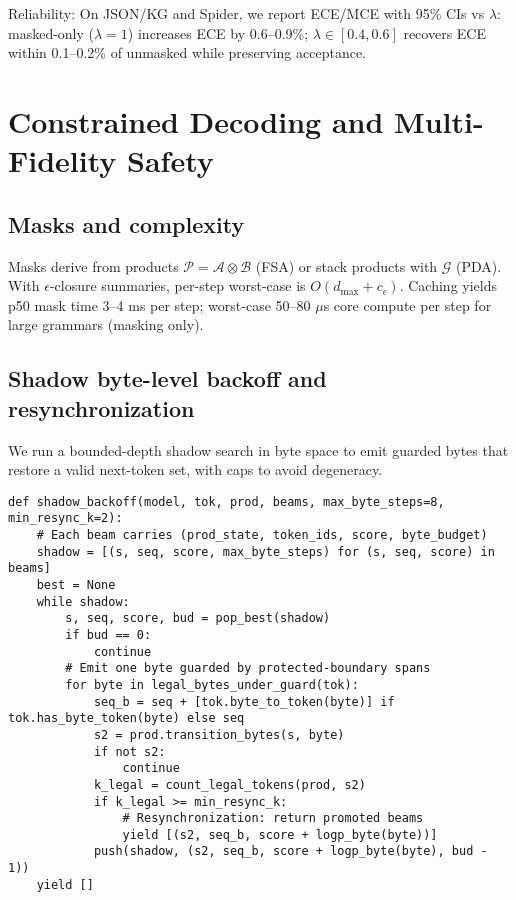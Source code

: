 \documentclass{article}
\begin{document}
Reliability: On JSON/KG and Spider, we report ECE/MCE with 95\% CIs vs $\lambda$: masked-only ($\lambda=1$) increases ECE by 0.6–0.9\%; $\lambda\in[0.4,0.6]$ recovers ECE within 0.1–0.2\% of unmasked while preserving acceptance.

\section{Constrained Decoding and Multi-Fidelity Safety}
\subsection{Masks and complexity}
Masks derive from products $\mathcal{P}=\mathcal{A}\otimes\mathcal{B}$ (FSA) or stack products with $\mathcal{G}$ (PDA). With $\epsilon$-closure summaries, per-step worst-case is $O(d_{\max}+c_\epsilon)$. Caching yields p50 mask time 3–4 ms per step; worst-case 50–80 $\mu$s core compute per step for large grammars (masking only).

\subsection{Shadow byte-level backoff and resynchronization}
We run a bounded-depth shadow search in byte space to emit guarded bytes that restore a valid next-token set, with caps to avoid degeneracy.

\begin{lstlisting}[style=py, caption={Shadow byte-level backoff with resynchronization and caps.}]
def shadow_backoff(model, tok, prod, beams, max_byte_steps=8, min_resync_k=2):
    # Each beam carries (prod_state, token_ids, score, byte_budget)
    shadow = [(s, seq, score, max_byte_steps) for (s, seq, score) in beams]
    best = None
    while shadow:
        s, seq, score, bud = pop_best(shadow)
        if bud == 0: 
            continue
        # Emit one byte guarded by protected-boundary spans
        for byte in legal_bytes_under_guard(tok):
            seq_b = seq + [tok.byte_to_token(byte)] if tok.has_byte_token(byte) else seq
            s2 = prod.transition_bytes(s, byte)
            if not s2: 
                continue
            k_legal = count_legal_tokens(prod, s2)
            if k_legal >= min_resync_k:
                # Resynchronization: return promoted beams
                yield [(s2, seq_b, score + logp_byte(byte))]
            push(shadow, (s2, seq_b, score + logp_byte(byte), bud - 1))
    yield []
\end{lstlisting}
\end{document}
